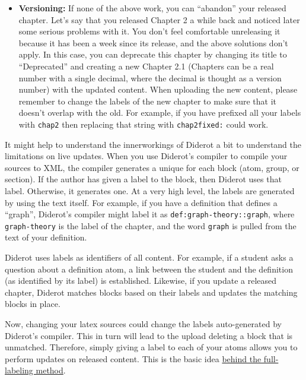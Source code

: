 \begin{note}
\begin{gram}
\begin{itemize}
\item \textbf{Versioning:} If none of the above work, you can ``abandon'' your released chapter.  Let's say that you released Chapter 2 a while back and noticed later some serious problems with it. You don't feel comfortable unreleasing it because it has been a week since its release, and the above solutions don't apply.  In this case, you can deprecate this chapter by changing its title to ``Deprecated'' and creating a new Chapter 2.1 (Chapters can be a real number with a single decimal, where the decimal is thought as a version number) with the updated content.  When uploading the new content, please remember to change the labels of the new chapter to make sure that it doesn't overlap with the old.  For example, if you have prefixed all your labels with 
%
\lstinline`chap2`
%
then replacing that string with 
%
\lstinline`chap2fixed:` 
%
could work.
\end{itemize}
\end{gram}

\begin{gram}
It might help to understand the innerworkings of Diderot a bit to understand the limitations on live updates.
%
When you use Diderot's compiler to compile your sources to XML, the compiler generates a unique  for each block (atom, group, or section).  
%
If the author has given a label to the block, then Diderot uses that label.
%
Otherwise, it generates one.
%
At a very high level, the labels are generated by using the text itself.  For example, if you have a definition that defines a ``graph'', Diderot's compiler might label it as \lstinline`def:graph-theory::graph`, where  
%
\lstinline`graph-theory` is the label of the chapter,
%
and the word \lstinline`graph` is pulled from the text of your definition.
%

Diderot uses labels as identifiers of all content.
%
For example, if a student asks a question about a definition atom, a link between the student and the definition (as identified by its label) is established.  
%
Likewise, if you update a released chapter, Diderot matches blocks based on their labels and updates the matching blocks in place.

Now, changing your latex sources could change the labels auto-generated by Diderot's compiler.  This in turn will lead to the upload deleting a block that is unmatched.
%
Therefore, simply giving a label to each of your atoms allows you to perform updates on released content.
%
This is the basic idea \href{sec:publish::full-labeling}{behind the full-labeling method}.
\end{gram}


\end{note}
